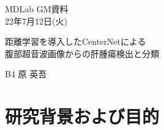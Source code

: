 \documentclass[a4j]{ujarticle}
\begin{document}
    \begin{flushright}
        MDLab GM資料\\
        22年7月12日(火)
    \end{flushright}

    \begin{center}
        {\Large	距離学習を導入したCenterNetによる\\腹部超音波画像からの肝腫瘍検出と分類}
    \end{center}

    \begin{flushright}
        {\large B4 原 英吾}\\
    \end{flushright}

    \section{研究背景および目的}
\end{document}
